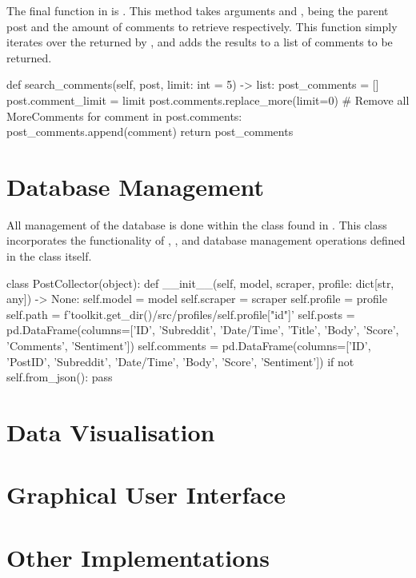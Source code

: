 The final function in  is . This method takes arguments  and , being the parent post and the amount of comments to retrieve respectively. This function simply iterates over the  returned by , and adds the results to a list of comments to be returned.

\begin{python}
def search_comments(self, post, limit: int = 5) -> list:
post_comments = []
    post.comment_limit = limit
    post.comments.replace_more(limit=0) # Remove all MoreComments
    for comment in post.comments:
        post_comments.append(comment)
    return post_comments
\end{python}

\section{Database Management}
All management of the database is done within the  class found in . This class incorporates the functionality of , , and database management operations defined in the class itself.

\begin{python}
class PostCollector(object):
    def __init__(self, model, scraper, profile: dict[str, any]) -> None:
        self.model = model
        self.scraper = scraper
        self.profile = profile
        self.path = f'{toolkit.get_dir()}/src/profiles/{self.profile["id"]}'
        self.posts = pd.DataFrame(columns=['ID', 'Subreddit', 'Date/Time', 'Title', 'Body', 'Score', 'Comments', 'Sentiment'])
        self.comments = pd.DataFrame(columns=['ID', 'PostID', 'Subreddit', 'Date/Time', 'Body', 'Score', 'Sentiment'])
        if not self.from_json():
            pass
\end{python}

\section{Data Visualisation}

\section{Graphical User Interface}

\section{Other Implementations}